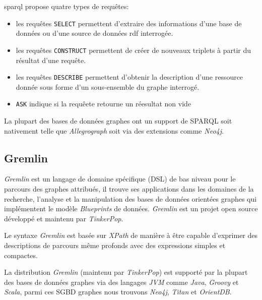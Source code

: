   \acrshort{sparql} propose quatre types de requêtes:\medskip

  \begin{itemize}\renewcommand\labelitemi{--}
  \item les requêtes \texttt{SELECT} permettent d'extraire des
    informations d'une base de données ou d'une source de données
    \acrshort{rdf} interrogée.

  \item les requêtes \texttt{CONSTRUCT} permettent de créer de
    nouveaux triplets à partir du résultat d'une requête.

  \item les requêtes \texttt{DESCRIBE} permettent d'obtenir la
    description d'une ressource donnée sous forme d'un
    sous-ensemble du graphe interrogé.

  \item \texttt{ASK} indique si la requêete retourne un réesultat non
    vide
  \end{itemize}
  \enddescription
  \medskip

  La plupart des bases de données graphes ont un support de
  \textsc{SPARQL} soit nativement telle que \emph{Allegrograph} soit
  via des extensions comme \emph{Neo4j}.

  \subsection{Gremlin}
  \label{sec:gremlin}
  \emph{Gremlin} \cite{gremlin-wiki} est un langage de domaine
  spécifique (\acrshort{DSL}) de bas niveau pour le parcours des
  graphes attribués, il trouve ses applications dans les domaines de
  la recherche, l'analyse et la manipulation des bases de données
  orientées graphes qui implémentent le modèle \emph{Blueprints}
  \cite{blueprints} de données. \emph{Gremlin} \cite{gremlin-wiki} est
  un projet open source développé et maintenu par
  \emph{TinkerPop}.\medskip

  Le syntaxe \emph{Gremlin} est basée sur \emph{XPath} de manière à
  être capable d'exprimer des descriptions de parcours même profonds
  avec des expressions simples et compactes.\medskip

  La distribution \emph{Gremlin} (maintenu par \emph{TinkerPop}) est
  supporté par la plupart des bases de données graphes via des
  langages \emph{JVM} comme \emph{Java}, \emph{Groovy} et
  \emph{Scala}, parmi ces \acrshort{SGBD} graphes nous trouvons
  \emph{Neo4j}, \emph{Titan} et \emph{OrientDB}.

